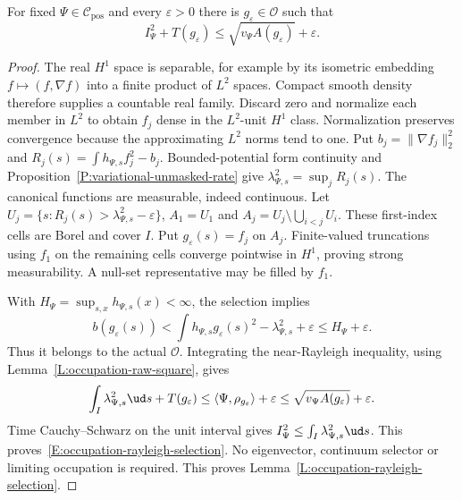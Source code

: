 \begin{lemma}
  \label{L:occupation-rayleigh-selection}
  For fixed $\Psi\in\mathcal C_{\mathrm{pos}}$ and every $\varepsilon>0$
  there is $g_\varepsilon\in\mathcal O$ such that
  \begin{equation}\label{E:occupation-rayleigh-selection}
    I_\Psi^2+T(g_\varepsilon)
    \le\sqrt{v_\Psi A(g_\varepsilon)}+\varepsilon .
  \end{equation}
\end{lemma}

\begin{proof}
  The real $H^1$ space is separable, for example by its isometric
  embedding $f\mapsto(f,\nabla f)$ into a finite product of $L^2$ spaces.
  Compact smooth density therefore supplies a countable real family.
  Discard zero and normalize each member in $L^2$ to obtain $f_j$
  dense in the $L^2$-unit $H^1$ class. Normalization preserves convergence
  because the approximating $L^2$ norms tend to one.
  Put $b_j=\|\nabla f_j\|_2^2$ and
  $R_j(s)=\int h_{\Psi,s}f_j^2-b_j$.
  Bounded-potential form continuity and
  Proposition~\ref{P:variational-unmasked-rate} give
  $\lambda_{\Psi,s}^2=\sup_jR_j(s)$.
  The canonical functions are measurable, indeed continuous.
  Let $U_j=\{s:R_j(s)>\lambda_{\Psi,s}^2-\varepsilon\}$,
  $A_1=U_1$ and $A_j=U_j\setminus\bigcup_{i<j}U_i$.
  These first-index cells are Borel and cover $I$.
  Put $g_\varepsilon(s)=f_j$ on $A_j$.
  Finite-valued truncations using $f_1$ on the remaining cells
  converge pointwise in $H^1$, proving strong measurability.
  A null-set representative may be filled by $f_1$.

  With $H_\Psi=\sup_{s,x}h_{\Psi,s}(x)<\infty$, the selection implies
  \[
    b(g_\varepsilon(s))
    <\int h_{\Psi,s}g_\varepsilon(s)^2-\lambda_{\Psi,s}^2+\varepsilon
    \le H_\Psi+\varepsilon .
  \]
  Thus it belongs to the actual $\mathcal O$.
  Integrating the near-Rayleigh inequality, using
  Lemma~\ref{L:occupation-raw-square}, gives
  \[
    \int_I\lambda_{\Psi,s}^2\ud s+T(g_\varepsilon)
    \le\langle\Psi,\rho_{g_\varepsilon}\rangle+\varepsilon
    \le\sqrt{v_\Psi A(g_\varepsilon)}+\varepsilon .
  \]
  Time Cauchy--Schwarz on the unit interval gives
  $I_\Psi^2\le\int_I\lambda_{\Psi,s}^2\ud s$.
  This proves~\eqref{E:occupation-rayleigh-selection}.
  No eigenvector, continuum selector or limiting occupation is required.
  This proves Lemma~\ref{L:occupation-rayleigh-selection}.
\end{proof}

